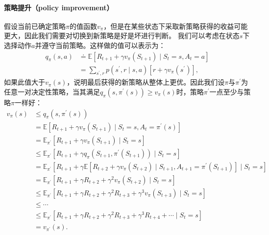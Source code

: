 \paragraph{策略提升（policy improvement）}
假设当前已确定策略$\pi$的值函数$v_{\pi}$，但是在某些状态下采取新策略获得的收益可能更大，因此我们需要对切换到新策略是好是坏进行判断。
我们可以考虑在状态$s$下选择动作$a$并遵守当前策略。这样做的值可以表示为：
  \begin{align*}
  q_{\pi}(s, a) & \doteq \mathbb{E}\left[R_{t+1}+\gamma v_{\pi}\left(S_{t+1}\right) \mid S_{t}=s, A_{t}=a\right] \\
  &=\sum_{s^{\prime}, r} p\left(s^{\prime}, r \mid s, a\right)\left[r+\gamma v_{\pi}\left(s^{\prime}\right)\right],
  \end{align*}
如果此值大于$v_{\pi}(s)$，说明最后获得的新策略从整体上更优。因此我们设$\pi$与$\pi^{\prime}$为任意一对决定性策略，当其满足$q_{\pi}\left(s, \pi^{\prime}(s)\right) \geq v_{\pi}(s)$时，策略$\pi^{\prime}$一点至少与策略$\pi$一样好：
  \begin{align}
  v_{\pi}(s) & \leq q_{\pi}\left(s, \pi^{\prime}(s)\right) \nonumber\\
  &=\mathbb{E}\left[R_{t+1}+\gamma v_{\pi}\left(S_{t+1}\right) \mid S_{t}=s, A_{t}=\pi^{\prime}(s)\right] \nonumber\\
  &=\mathbb{E}_{\pi^{\prime}}\left[R_{t+1}+\gamma v_{\pi}\left(S_{t+1}\right) \mid S_{t}=s\right] \nonumber\\
  & \leq \mathbb{E}_{\pi^{\prime}}\left[R_{t+1}+\gamma q_{\pi}\left(S_{t+1}, \pi^{\prime}\left(S_{t+1}\right)\right) \mid S_{t}=s\right] \nonumber\\
  &=\mathbb{E}_{\pi^{\prime}}\left[R_{t+1}+\gamma \mathbb{E}\left[R_{t+2}+\gamma v_{\pi}\left(S_{t+2}\right) \mid S_{t+1}, A_{t+1}=\pi^{\prime}\left(S_{t+1}\right)\right] \mid S_{t}=s\right] \nonumber\\
  &=\mathbb{E}_{\pi^{\prime}}\left[R_{t+1}+\gamma R_{t+2}+\gamma^{2} v_{\pi}\left(S_{t+2}\right) \mid S_{t}=s\right] \nonumber\\
  & \leq \mathbb{E}_{\pi^{\prime}}\left[R_{t+1}+\gamma R_{t+2}+\gamma^{2} R_{t+3}+\gamma^{3} v_{\pi}\left(S_{t+3}\right) \mid S_{t}=s\right] \nonumber\\
  & \leq \cdots \nonumber\\
  & \leq \mathbb{E}_{\pi^{\prime}}\left[R_{t+1}+\gamma R_{t+2}+\gamma^{2} R_{t+3}+\gamma^{3} R_{t+4}+\cdots \mid S_{t}=s\right] \nonumber\\
  &=v_{\pi^{\prime}}(s) .
  \label{eq:dddd}
  \end{align}
